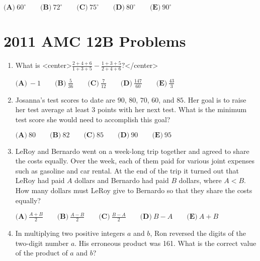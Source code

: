 \documentclass{article}
\begin{document}
\begin{enumerate}[label=\arabic*., itemsep=0.5em]
\(
\textbf{(A)}\ 60^{\circ} \qquad
\textbf{(B)}\ 72^{\circ} \qquad
\textbf{(C)}\ 75^{\circ} \qquad
\textbf{(D)}\ 80^{\circ} \qquad
\textbf{(E)}\ 90^{\circ} \)\par \vspace{0.5em}\end{enumerate}\newpage\section*{2011 AMC 12B Problems}
\begin{enumerate}[label=\arabic*., itemsep=0.5em]\item What is <center>\( \frac{2+4+6}{1+3+5}-\frac{1+3+5}{2+4+6}? \)</center>


\(\textbf{(A)}\ -1 \qquad \textbf{(B)}\ \frac{5}{36} \qquad \textbf{(C)}\ \frac{7}{12} \qquad \textbf{(D)}\ \frac{147}{60} \qquad \textbf{(E)}\ \frac{43}{3}\)\par \vspace{0.5em}\item Josanna's test scores to date are \(90\), \(80\), \(70\), \(60\), and \(85\).  Her goal is to raise her test average at least \(3\) points with her next test.  What is the minimum test score she would need to accomplish this goal?

\(\textbf{(A)}\ 80 \qquad \textbf{(B)}\ 82 \qquad \textbf{(C)}\ 85 \qquad \textbf{(D)}\ 90 \qquad \textbf{(E)}\ 95\)\par \vspace{0.5em}\item LeRoy and Bernardo went on a week-long trip together and agreed to share the costs equally.  Over the week, each of them paid for various joint expenses such as gasoline and car rental.  At the end of the trip it turned out that LeRoy had paid \(A\) dollars and Bernardo had paid \(B\) dollars, where \(A<B\).  How many dollars must LeRoy give to Bernardo so that they share the costs equally?

\(\textbf{(A)}\ \frac{A+B}{2} \qquad \textbf{(B)}\ \frac{A-B}{2} \qquad \textbf{(C)}\ \frac{B-A}{2} \qquad \textbf{(D)}\ B-A \qquad \textbf{(E)}\ A+B\)\par \vspace{0.5em}\item In multiplying two positive integers \(a\) and \(b\), Ron reversed the digits of the two-digit number \(a\).  His erroneous product was 161.  What is the correct value of the product of \(a\) and \(b\)?


\end{enumerate}
\end{document}
